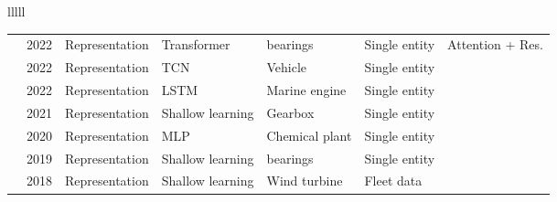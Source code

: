 \begin{landscape}
\begin{longtable}{lllll}
\begin{tabular}{lllllll}
\cite{chiBearingFaultDiagnosis2022} & 2022 & Representation & Transformer & bearings & Single entity & Attention + Res. \\
\cite{neupaneTemporalAnomalyDetection2022} & 2022 & Representation & TCN & Vehicle & Single entity & \texttimes \\
\cite{velasco-gallegoRADISRealtimeAnomaly2022} & 2022 & Representation & LSTM & Marine engine & Single entity & \texttimes \\
\cite{huNovelVehicleGearbox2021} & 2021 & Representation & Shallow learning & Gearbox & Single entity & \texttimes \\
\cite{kimSemiSupervisedAutoencoderAuxiliary2020} & 2020 & Representation & MLP & Chemical plant & Single entity & \texttimes \\
\cite{songUnsupervisedFaultDiagnosis2019} & 2019 & Representation & Shallow learning & bearings & Single entity & \texttimes \\
\cite{helsenFleetwideConditionMonitoring2018} & 2018 & Representation & Shallow learning & Wind turbine & Fleet data & \texttimes \\
\bottomrule
\end{tabular}

\end{longtable}
\end{landscape}
